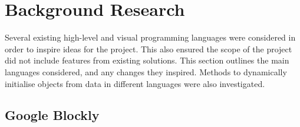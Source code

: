 \documentclass[
11pt,
english,
singlespacing,
headsepline,
]{MastersDoctoralThesis}
\begin{document}

\chapter{Background Research}

Several existing high-level and visual programming languages were considered in order to inspire ideas for the project. This also ensured the scope of the project did not include features from existing solutions. This section outlines the main languages considered, and any changes they inspired. Methods to dynamically initialise objects from data in different languages were also investigated.

\section{Google Blockly}
\end{document}
